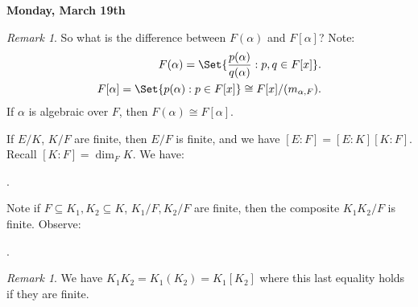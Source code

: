 \documentclass[9pt,reqno,twoside]{amsbook}
\theoremstyle{plain}
\numberwithin{section}{chapter}
\numberwithin{equation}{chapter}
\theoremstyle{definition}
\theoremstyle{remark}
\newtheorem{rem}[theorem]{Remark}
\theoremstyle{plain}
\newcommand{\sub}{\subseteq}
\newcommand{\bee}{\begin{equation}\begin{aligned}}
\newcommand{\eee}{\end{aligned}\end{equation}}
\newcommand{\fracc}{\frac}
\renewcommand{\leq}{\leqslant}
\begin{document}


\textbf{Monday, March 19th}

\begin{rem}
So what is the difference between $F(\alpha)$ and $F[\alpha]$? Note:
\bee
F(\alpha) = \Set{\fracc{p(\alpha)}{q(\alpha)}:p,q \in F[x]}.\\
F[\alpha] = \Set{p(\alpha):p \in F[x]} \cong F[x]/(m_{\alpha,F}). 
\eee
If $\alpha$ is algebraic over $F$, then $F(\alpha) \cong F[\alpha]$. 
\end{rem}

If $E/K$, $K/F$ are finite, then $E/F$ is finite, and we have $[E:F] = [E:K][K:F]$. Recall $[K:F] = \dim_FK$. We have:
\begin{center}
.
\end{center}

Note if $F\sub K_1,K_2 \sub K$, $K_1/F,K_2/F$ are finite, then the composite $K_1K_2/F$ is finite. Observe:
\begin{center}
.
\end{center}

\begin{rem}
We have $K_1K_2 = K_1(K_2) = K_1[K_2]$ where this last equality holds if they are finite. 
\end{rem}
\end{document}
